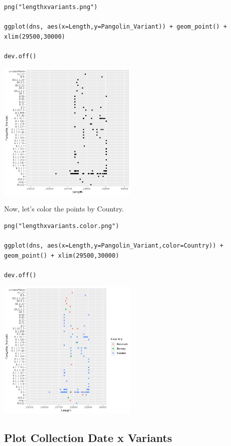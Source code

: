 \documentclass[
]{book}
\begin{document}
\begin{verbatim}
png("lengthxvariants.png")

ggplot(dns, aes(x=Length,y=Pangolin_Variant)) + geom_point() + xlim(29500,30000)

dev.off()
\end{verbatim}

\includegraphics[width=0.5\textwidth,height=\textheight]{./Figures/lengthxvariants.png}

Now, let's color the points by Country.

\begin{verbatim}
png("lengthxvariants.color.png")

ggplot(dns, aes(x=Length,y=Pangolin_Variant,color=Country)) + geom_point() + xlim(29500,30000)

dev.off()
\end{verbatim}

\includegraphics[width=0.5\textwidth,height=\textheight]{./Figures/lengthxvariants.color.png}

\hypertarget{plot-collection-date-x-variants}{%
\subsection{Plot Collection Date x Variants}\label{plot-collection-date-x-variants}}
\end{document}
